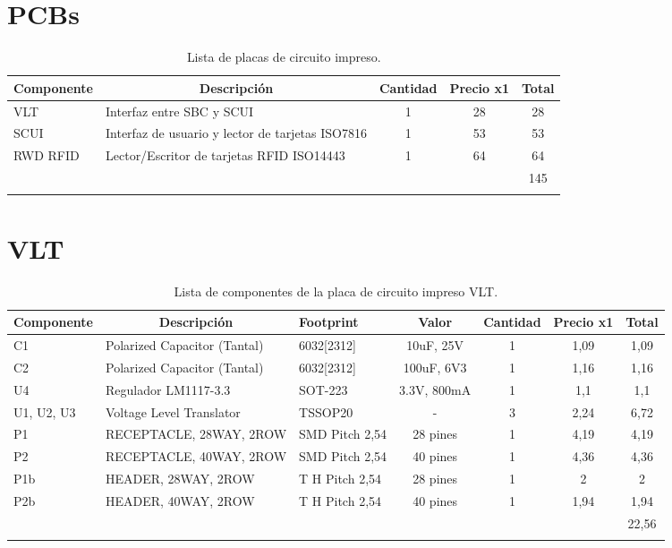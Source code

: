 \section{PCBs}
\begin{longtable}{|l|p{5cm}|c|c|c|}
\hline
\multicolumn{1}{|c|}{\textbf{Componente}} & \multicolumn{1}{c|}{\textbf{Descripción}} & \textbf{Cantidad} & \textbf{Precio x1} & \textbf{Total} \\ \hline
VLT & Interfaz entre SBC y SCUI & 1 & 28 & 28 \\ \hline
SCUI & Interfaz de usuario y lector de tarjetas ISO7816 & 1 & 53 & 53 \\ \hline
RWD RFID & Lector/Escritor de tarjetas RFID ISO14443 & 1 & 64 & 64 \\ \hline
 &  & \multicolumn{1}{l|}{} & \multicolumn{1}{l|}{} & 145 \\ \hline
\caption{Lista de placas de circuito impreso.}
\label{}
\end{longtable}

\newpage
\section{VLT}
\begin{longtable}{|p{1.5cm}|p{3cm}|p{2cm}|c|c|c|c|}
\hline
\multicolumn{1}{|c|}{\textbf{Componente}} & \multicolumn{1}{c|}{\textbf{Descripción}} & \textbf{ Footprint} & \textbf{Valor} & \textbf{Cantidad} & \textbf{Precio x1} & \textbf{Total} \\ \hline
C1 & Polarized Capacitor (Tantal) & 6032[2312] & 10uF, 25V & 1 & 1,09 & 1,09 \\ \hline
C2 & Polarized Capacitor (Tantal) & 6032[2312] & 100uF, 6V3 & 1 & 1,16 & 1,16 \\ \hline
U4 & Regulador LM1117-3.3 & SOT-223 & 3.3V, 800mA & 1 & 1,1 & 1,1 \\ \hline
U1, U2, U3 & Voltage Level Translator & TSSOP20 & - & 3 & 2,24 & 6,72 \\ \hline
P1 & RECEPTACLE, 28WAY, 2ROW & SMD  Pitch 2,54 & 28 pines & 1 & 4,19 & 4,19 \\ \hline
P2 & RECEPTACLE, 40WAY, 2ROW & SMD  Pitch 2,54 & 40 pines & 1 & 4,36 & 4,36 \\ \hline
P1b & HEADER, 28WAY, 2ROW & T H Pitch 2,54 & 28 pines & 1 & 2 & 2 \\ \hline
P2b & HEADER, 40WAY, 2ROW & T H Pitch 2,54 & 40 pines & 1 & 1,94 & 1,94 \\ \hline
 &  & \multicolumn{1}{l|}{} & \multicolumn{1}{l|}{} & \multicolumn{1}{l|}{} & \multicolumn{1}{l|}{} & 22,56 \\ \hline
\caption{Lista de componentes de la placa de circuito impreso VLT.}
\label{}
\end{longtable}

